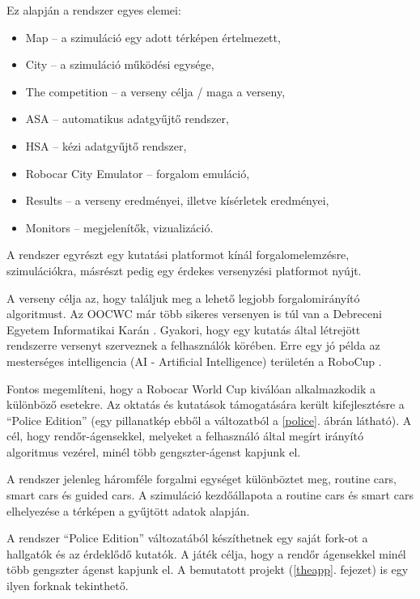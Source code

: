 \documentclass[a4paper,12pt]{report}
\begin{document}
Ez alapján a rendszer egyes elemei:

\begin{itemize}
\item Map -- a szimuláció egy adott térképen értelmezett,
\item City -- a szimuláció működési egysége,
\item The competition -- a verseny célja / maga a verseny,
\item ASA -- automatikus adatgyűjtő rendszer,
\item HSA -- kézi adatgyűjtő rendszer,
\item Robocar City Emulator -- forgalom emuláció,
\item Results -- a verseny eredményei, illetve kísérletek eredményei,
\item Monitors -- megjelenítők, vizualizáció.
\end{itemize}

A rendszer egyrészt egy kutatási platformot kínál forgalomelemzésre, szimulációkra, másrészt pedig egy érdekes versenyzési platformot nyújt.

\vspace{2mm}
A verseny célja az, hogy találjuk meg a lehető legjobb forgalomirányító algoritmust. Az OOCWC már több sikeres versenyen is túl van a Debreceni Egyetem Informatikai Karán \cite{competitions}. Gyakori, hogy egy kutatás által létrejött rendszerre versenyt szerveznek a felhasználók körében. Erre egy jó példa az mesterséges intelligencia (AI - Artificial Intelligence) területén a RoboCup \cite{robocup}.

\vspace{2mm}
Fontos megemlíteni, hogy a Robocar World Cup kiválóan alkalmazkodik a különböző esetekre. Az oktatás és kutatások támogatására került kifejlesztésre a ``Police Edition'' (egy pillanatkép ebből a változatból a \ref{police}. ábrán látható). A cél, hogy rendőr-ágensekkel, melyeket a felhasználó által megírt irányító algoritmus vezérel, minél több gengszter-ágenst kapjunk el.

\vspace{2mm}
A rendszer jelenleg háromféle forgalmi egységet különböztet meg, routine cars, smart cars és guided cars. A szimuláció kezdőállapota a routine cars és smart cars elhelyezése a térképen a gyűjtött adatok alapján.

\vspace{2mm}
A rendszer ``Police Edition'' változatából készíthetnek egy saját fork-ot a hallgatók és az érdeklődő kutatók. A játék célja, hogy a rendőr ágensekkel minél több gengszter ágenst kapjunk el. A bemutatott projekt (\ref{theapp}. fejezet) is egy ilyen forknak tekinthető.
\end{document}
